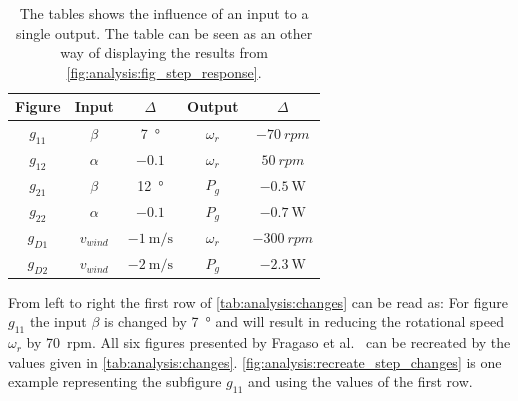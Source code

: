 \begin{table}[H]
    \caption{The tables shows the influence of an input to a single output. The table can be seen as an other way of displaying the results from \autoref{fig:analysis:fig_step_response}.}
    \centering
    \begin{tabular}{ccccc} \toprule
        Figure & Input & $\Delta$ & Output & $\Delta$ \\ \midrule
        $g_{11}$ & $\beta$    & \SI{7}{\degree}               & $\omega_r$  & $\SI{-70}{rpm}$ \\
        $g_{12}$ & $\alpha$   & $-0.1$                        & $\omega_r$  & $\SI{50}{rpm}$ \\
        $g_{21}$ & $\beta$    & \SI{12}{\degree}              & $P_g$       & $\SI{-0.5}{\watt}$ \\
        $g_{22}$ & $\alpha$   & $-0.1$                        & $P_g$       & $\SI{-0.7}{\watt}$ \\
        $g_{D1}$ & $v_{wind}$ & $\SI{-1}{\metre\per\second}$  & $\omega_r$  & $\SI{-300}{rpm}$ \\
        $g_{D2}$ & $v_{wind}$ & $\SI{-2}{\metre\per\second}$  & $P_g$       & $\SI{-2.3}{\watt}$ \\ \bottomrule
    \end{tabular}
    \label{tab:analysis:changes}
\end{table}

From left to right the first row of \autoref{tab:analysis:changes} can be read as: For figure $g_{11}$ the input $\beta$ is changed by \SI{7}{\degree} and will result in reducing the rotational speed $\omega_r$ by \SI{70}{rpm}.
All six figures presented by Fragaso et al.~ can be recreated by the values given in \autoref{tab:analysis:changes}.
\autoref{fig:analysis:recreate_step_changes} is one example representing the subfigure $g_{11}$ and using the values of the first row.

